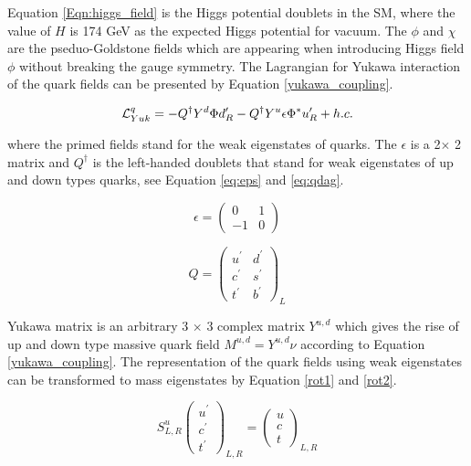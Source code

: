  Equation \ref{Eqn:higgs_field} is the Higgs potential doublets in the SM, where the value of $H$ is 174 GeV as the expected Higgs potential for vacuum\cite{sher1989electroweak}. The $\phi$ and $\chi$ are the pseduo-Goldstone fields which are appearing when introducing Higgs field  $\phi$ without breaking the gauge symmetry. The Lagrangian for Yukawa interaction of the quark fields\cite{ceccucci2008ckm} can be presented by Equation \ref{yukawa_coupling}.

\begin{equation}{\label{yukawa_coupling}}
\large
\mathcal{L}_{Yuk}^q = 
-{Q}^\dag Y^d \Phi d_R^\prime 
-{Q}^\dag Y^u \epsilon \Phi^* u_R^\prime
+ h.c.
\end{equation}

where the primed fields stand for the weak eigenstates of quarks. The $\epsilon$ is a 2$\times$ 2 matrix and $Q^\dag$ is the left-handed doublets that stand for weak eigenstates of up and down types quarks, see Equation \ref{eq:eps} and \ref{eq:qdag}. 

\begin{equation}\label{eq:eps}
\epsilon =  
\begin{pmatrix}
0 & 1\\
-1 & 0
\end{pmatrix}
\end{equation}

\begin{equation}\label{eq:qdag}
Q =  
\begin{pmatrix}
u^\prime & d^\prime \\
c^\prime & s^\prime \\
t^\prime & b^\prime
\end{pmatrix}_L
\end{equation}

Yukawa matrix is an arbitrary 3 $\times$ 3 complex matrix $Y^{u,d}$ which gives the rise of up and down type massive quark field $M^{u,d}=Y^{u,d}\nu$ according to Equation \ref{yukawa_coupling}. The representation of the quark fields using weak eigenstates can be transformed to mass eigenstates by Equation \ref{rot1} and \ref{rot2}.

\begin{equation}\label{rot1}
S_{L,R}^{u}
\begin{pmatrix}
u^\prime   \\
c^\prime  \\
t^\prime 
\end{pmatrix}_{L,R}
= \begin{pmatrix}
u  \\
c  \\
t 
\end{pmatrix}_{L,R}
\end{equation}

